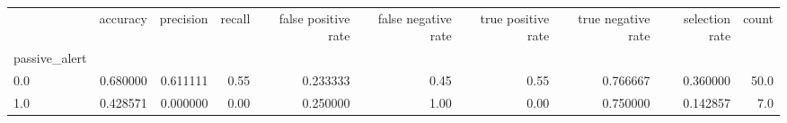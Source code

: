 \begin{tabular}{lrrrrrrrrr}
\toprule
{} &  accuracy &  precision &  recall &  false positive rate &  false negative rate &  true positive rate &  true negative rate &  selection rate &  count \\
passive\_alert &           &            &         &                      &                      &                     &                     &                 &        \\
\midrule
0.0           &  0.680000 &   0.611111 &    0.55 &             0.233333 &                 0.45 &                0.55 &            0.766667 &        0.360000 &   50.0 \\
1.0           &  0.428571 &   0.000000 &    0.00 &             0.250000 &                 1.00 &                0.00 &            0.750000 &        0.142857 &    7.0 \\
\bottomrule
\end{tabular}
